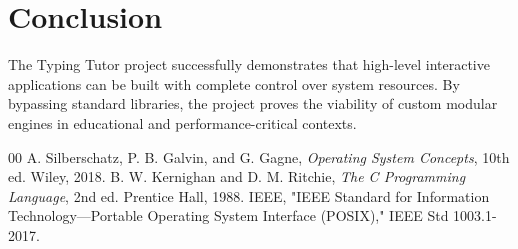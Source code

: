\documentclass[conference]{IEEEtran}
\begin{document}
\section{Conclusion}
The Typing Tutor project successfully demonstrates that high-level interactive applications can be built with complete control over system resources. By bypassing standard libraries, the project proves the viability of custom modular engines in educational and performance-critical contexts.

\begin{thebibliography}{00}
 A. Silberschatz, P. B. Galvin, and G. Gagne, \textit{Operating System Concepts}, 10th ed. Wiley, 2018.
 B. W. Kernighan and D. M. Ritchie, \textit{The C Programming Language}, 2nd ed. Prentice Hall, 1988.
 IEEE, "IEEE Standard for Information Technology—Portable Operating System Interface (POSIX)," IEEE Std 1003.1-2017.
\end{thebibliography}
\end{document}
